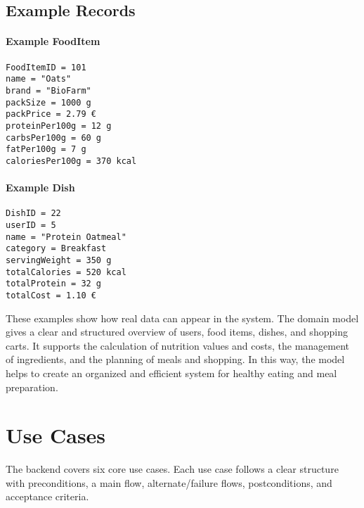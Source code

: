 \documentclass[11pt]{article}
\begin{document}
\subsection*{Example Records}

\paragraph{Example FoodItem}
\begin{verbatim}
FoodItemID = 101
name = "Oats"
brand = "BioFarm"
packSize = 1000 g
packPrice = 2.79 €
proteinPer100g = 12 g
carbsPer100g = 60 g
fatPer100g = 7 g
caloriesPer100g = 370 kcal
\end{verbatim}

\paragraph{Example Dish}
\begin{verbatim}
DishID = 22
userID = 5
name = "Protein Oatmeal"
category = Breakfast
servingWeight = 350 g
totalCalories = 520 kcal
totalProtein = 32 g
totalCost = 1.10 €
\end{verbatim}

These examples show how real data can appear in the system.
The domain model gives a clear and structured overview of users, food items, dishes, and shopping carts.
It supports the calculation of nutrition values and costs, the management of ingredients, and the planning of meals and shopping.
In this way, the model helps to create an organized and efficient system for healthy eating and meal preparation.

\section{Use Cases}

The backend covers six core use cases. Each use case follows a clear structure with preconditions, a main flow, alternate/failure flows, postconditions, and acceptance criteria.
\end{document}
